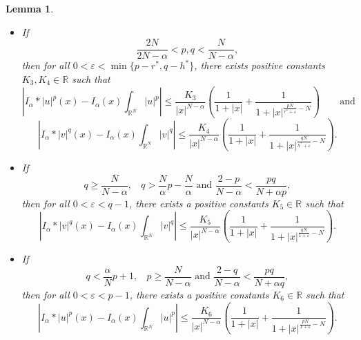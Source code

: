 \documentclass[12pt,a4paper]{article}
\newtheorem{lemma}[theorem]{Lemma}
\numberwithin{equation}{section}
\begin{document}
\begin{lemma}
\begin{itemize}
    \item[(b)]  If
    $$
    \dfrac{2N}{2N-\alpha}<p,q< \dfrac{N}{N-\alpha},
    $$
    then for all $0<\varepsilon< \min\{p - r^{\ast}, q- h^{\ast}\}$, there exists positive constants $K_3, K_4\in \mathbb{R}$ such that
    \begin{equation}\label{decnuc3}
        \left| I_\alpha\ast |u|^p(x)-I_\alpha(x)\int_{\mathbb{R}^N} |u|^p \right| \leq \dfrac{K_3}{|x|^{N-\alpha}}\left(\dfrac{1}{1+|x|}+\dfrac{1}{1+|x|^{\frac{pN}{r^\ast +\varepsilon}-N}}\right) \qquad \text{and}
    \end{equation} 
    \begin{equation}\label{decnuc4}
      \left| I_\alpha\ast |v|^q(x)-I_\alpha(x)\int_{\mathbb{R}^N} |v|^q \right| \leq \dfrac{K_4}{|x|^{N-\alpha}}\left(\dfrac{1}{1+|x|}+\dfrac{1}{1+|x|^{\frac{qN}{h^\ast + \varepsilon}-N}}\right).  
    \end{equation}
    \item[(c)] If
     $$
    q \geq \dfrac{N}{N-\alpha},  \ \ \ \ q > \dfrac{N}{\alpha}p - \dfrac{N}{\alpha} \mbox{ \ \ \ and \ \ \ } \frac{2-p}{N-\alpha}<\frac{pq}{N+\alpha p},
    $$
    then for all $0<\varepsilon <  q-1$, there exists a positive constants $K_5\in \mathbb{R}$ such that 
    \begin{equation}\label{decnuc6}
      \left| I_\alpha\ast |v|^q(x)-I_\alpha(x)\int_{\mathbb{R}^N} |v|^q \right| \leq \dfrac{K_5}{|x|^{N-\alpha}}\left(\dfrac{1}{1+|x|}+\dfrac{1}{1+|x|^{\frac{qN}{1+\varepsilon}-N}}\right).  
    \end{equation}
    \item[(d)] If
      $$
    q < \dfrac{\alpha}{N}p + 1, \ \ \ \  p \geq \dfrac{N}{N-\alpha} \mbox{ \ \ \ and \ \ \ } \frac{2-q}{N-\alpha}<\frac{pq}{N+\alpha q},
    $$
    then for all $0<\varepsilon <  p-1$, there exists a positive constants $K_6 \in \mathbb{R}$ such that 
    \begin{equation}\label{decnuc7}
        \left| I_\alpha\ast |u|^p(x)-I_\alpha(x)\int_{\mathbb{R}^N} |u|^p \right| \leq \dfrac{K_6}{|x|^{N-\alpha}}\left(\dfrac{1}{1+|x|}+\dfrac{1}{1+|x|^{\frac{pN}{1+\varepsilon}-N}}\right).
    \end{equation} 
\end{itemize}
\end{lemma}
    
\end{document}
